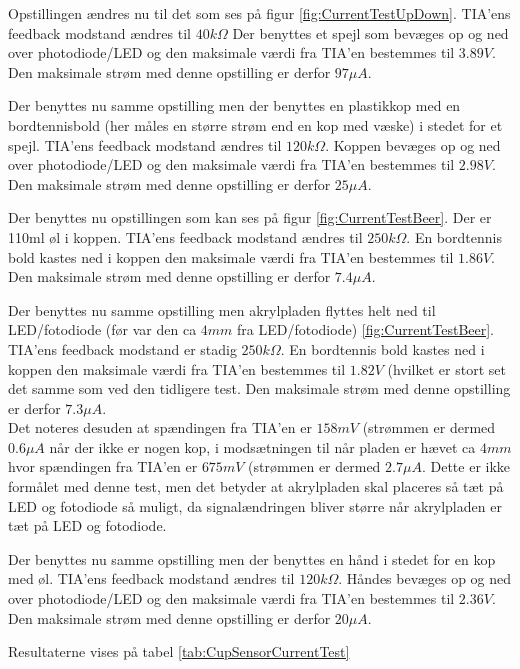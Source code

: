 \documentclass[HardwareDesign/HardwareDesign_main.tex]{subfiles}
\begin{document}
{Opstillingen ændres nu til det som ses på figur \ref{fig:CurrentTestUpDown}. TIA'ens feedback modstand ændres til $40\si{k\Omega}$ Der benyttes et spejl som bevæges op og ned over photodiode/LED og den maksimale værdi fra TIA'en bestemmes til $3.89\si{V}$. Den maksimale strøm med denne opstilling er derfor $97\si{\mu A}$.

Der benyttes nu samme opstilling men der benyttes en plastikkop med en bordtennisbold (her måles en større strøm end en kop med væske) i stedet for et spejl. TIA'ens feedback modstand ændres til $120\si{k\Omega}$. Koppen bevæges op og ned over photodiode/LED og den maksimale værdi fra TIA'en bestemmes til $2.98\si{V}$. Den maksimale strøm med denne opstilling er derfor $25\si{\mu A}$.

Der benyttes nu opstillingen som kan ses på figur \ref{fig:CurrentTestBeer}. Der er 110ml øl i koppen. TIA'ens feedback modstand ændres til $250\si{k\Omega}$. En bordtennis bold kastes ned i koppen den maksimale værdi fra TIA'en bestemmes til $1.86\si{V}$. Den maksimale strøm med denne opstilling er derfor $7.4\si{\mu A}$.

Der benyttes nu samme opstilling men akrylpladen flyttes helt ned til LED/fotodiode (før var den ca $4\si{mm}$ fra LED/fotodiode) \ref{fig:CurrentTestBeer}. TIA'ens feedback modstand er stadig $250\si{k\Omega}$. En bordtennis bold kastes ned i koppen den maksimale værdi fra TIA'en bestemmes til $1.82\si{V}$ (hvilket er stort set det samme som ved den tidligere test. Den maksimale strøm med denne opstilling er derfor $7.3\si{\mu A}$. \\
Det noteres desuden at spændingen fra TIA'en er $158\si{mV}$ (strømmen er dermed $0.6\si{\mu A}$ når der ikke er nogen kop, i modsætningen til når pladen er hævet ca $4\si{mm}$ hvor spændingen fra TIA'en er $675\si{mV}$ (strømmen er dermed $2.7\si{\mu A}$. Dette er ikke formålet med denne test, men det betyder at akrylpladen skal placeres så tæt på LED og fotodiode så muligt, da signalændringen bliver større når akrylpladen er tæt på LED og fotodiode. 

Der benyttes nu samme opstilling men der benyttes en hånd i stedet for en kop med øl. TIA'ens feedback modstand ændres til $120\si{k\Omega}$. Håndes bevæges op og ned over photodiode/LED og den maksimale værdi fra TIA'en bestemmes til $2.36\si{V}$. Den maksimale strøm med denne opstilling er derfor $20\si{\mu A}$.

Resultaterne vises på tabel \ref{tab:CupSensorCurrentTest}

}
\end{document}
